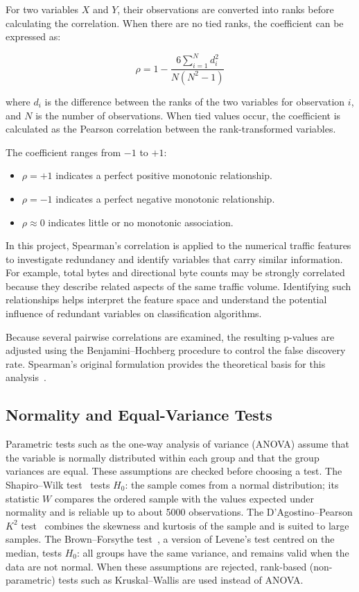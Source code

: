 For two variables $X$ and $Y$, their observations are converted into ranks before calculating the correlation. When there are no tied ranks, the coefficient can be expressed as:

\begin{equation}
\rho =
1-\frac{6\sum_{i=1}^{N}d_i^2}
{N(N^2-1)}
\label{eq:spearman}
\end{equation}

where $d_i$ is the difference between the ranks of the two variables for observation $i$, and $N$ is the number of observations. When tied values occur, the coefficient is calculated as the Pearson correlation between the rank-transformed variables.

The coefficient ranges from $-1$ to $+1$:

\begin{itemize}
  \item $\rho=+1$ indicates a perfect positive monotonic relationship.
  \item $\rho=-1$ indicates a perfect negative monotonic relationship.
  \item $\rho\approx 0$ indicates little or no monotonic association.
\end{itemize}

In this project, Spearman's correlation is applied to the numerical traffic features to investigate redundancy and identify variables that carry similar information. For example, total bytes and directional byte counts may be strongly correlated because they describe related aspects of the same traffic volume. Identifying such relationships helps interpret the feature space and understand the potential influence of redundant variables on classification algorithms.

Because several pairwise correlations are examined, the resulting p-values are adjusted using the Benjamini--Hochberg procedure to control the false discovery rate. Spearman's original formulation provides the theoretical basis for this analysis~\cite{spearman1904proof}.

\subsection{Normality and Equal-Variance Tests}
Parametric tests such as the one-way analysis of variance (ANOVA) assume that the variable is normally distributed within each group and that the group variances are equal. These assumptions are checked before choosing a test. The Shapiro--Wilk test~\cite{shapiro1965analysis} tests $H_0$: the sample comes from a normal distribution; its statistic $W$ compares the ordered sample with the values expected under normality and is reliable up to about \num{5000} observations. The D'Agostino--Pearson $K^2$ test~\cite{dagostino1973tests} combines the skewness and kurtosis of the sample and is suited to large samples. The Brown--Forsythe test~\cite{brown1974robust}, a version of Levene's test centred on the median, tests $H_0$: all groups have the same variance, and remains valid when the data are not normal. When these assumptions are rejected, rank-based (non-parametric) tests such as Kruskal--Wallis are used instead of ANOVA.

